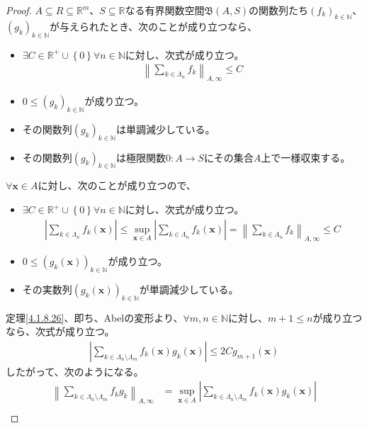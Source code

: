\documentclass[dvipdfmx]{jsarticle}
\begin{document}
\begin{proof}
$A \subseteq R \subseteq \mathbb{R}^{m}$、$S \subseteq \mathbb{R}$なる有界関数空間$\mathfrak{B}(A,S)$の関数列たち$\left( f_{k} \right)_{k \in \mathbb{N}}$、$\left( g_{k} \right)_{k \in \mathbb{N}}$が与えられたとき、次のことが成り立つなら、
\begin{itemize}
\item
  $\exists C \in \mathbb{R}^{+} \cup \left\{ 0 \right\}\forall n \in \mathbb{N}$に対し、次式が成り立つ。
\begin{align*}
\left\| \sum_{k \in \varLambda_{n}} f_{k} \right\|_{A,\infty} \leq C
\end{align*}
\item
  $0 \leq \left( g_{k} \right)_{k \in \mathbb{N}}$が成り立つ。
\item
  その関数列$\left( g_{k} \right)_{k \in \mathbb{N}}$は単調減少している。
\item
  その関数列$\left( g_{k} \right)_{k \in \mathbb{N}}$は極限関数$0:A \rightarrow S$にその集合$A$上で一様収束する。
\end{itemize}
$\forall\mathbf{x} \in A$に対し、次のことが成り立つので、
\begin{itemize}
\item
  $\exists C \in \mathbb{R}^{+} \cup \left\{ 0 \right\}\forall n \in \mathbb{N}$に対し、次式が成り立つ。
\begin{align*}
\left| \sum_{k \in \varLambda_{n}} {f_{k}\left( \mathbf{x} \right)} \right| \leq \sup_{\mathbf{x} \in A}\left| \sum_{k \in \varLambda_{n}} {f_{k}\left( \mathbf{x} \right)} \right| = \left\| \sum_{k \in \varLambda_{n}} f_{k} \right\|_{A,\infty} \leq C
\end{align*}
\item
  $0 \leq \left( g_{k}\left( \mathbf{x} \right) \right)_{k \in \mathbb{N}}$が成り立つ。
\item
  その実数列$\left( g_{k}\left( \mathbf{x} \right) \right)_{k \in \mathbb{N}}$が単調減少している。
\end{itemize}
定理\ref{4.1.8.26}、即ち、Abelの変形より、$\forall m,n \in \mathbb{N}$に対し、$m + 1 \leq n$が成り立つなら、次式が成り立つ。
\begin{align*}
\left| \sum_{k \in \varLambda_{n} \setminus \varLambda_{m}} {f_{k}\left( \mathbf{x} \right)g_{k}\left( \mathbf{x} \right)} \right| \leq 2Cg_{m + 1}\left( \mathbf{x} \right)
\end{align*}
したがって、次のようになる。
\begin{align*}
\left\| \sum_{k \in \varLambda_{n} \setminus \varLambda_{m}} {f_{k}g_{k}} \right\|_{A,\infty} &= \sup_{\mathbf{x} \in A}\left| \sum_{k \in \varLambda_{n} \setminus \varLambda_{m}} {f_{k}\left( \mathbf{x} \right)g_{k}\left( \mathbf{x} \right)} \right|\\

\end{align*}
\end{proof}
\end{document}
